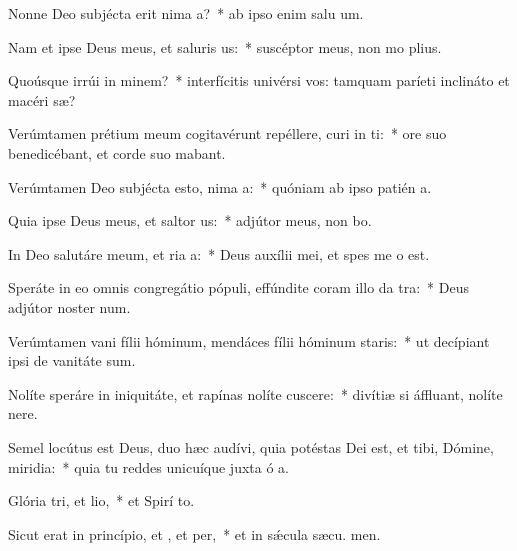 \item Nonne Deo subjécta erit nima a?~* ab ipso enim salu um.
\item Nam et ipse Deus meus, et saluris us:~* suscéptor meus, non mo plius.
\item Quoúsque irrúi in minem?~* interfícitis univérsi vos: tamquam paríeti inclináto et macéri sæ?
\item Verúmtamen prétium meum cogitavérunt repéllere, curi in ti:~* ore suo benedicébant, et corde suo mabant.
\item Verúmtamen Deo subjécta esto, nima a:~* quóniam ab ipso patién a.
\item Quia ipse Deus meus, et saltor us:~* adjútor meus, non bo.
\item In Deo salutáre meum, et ria a:~* Deus auxílii mei, et spes me  o est.
\item Speráte in eo omnis congregátio pópuli, effúndite coram illo da tra:~* Deus adjútor noster  num.
\item Verúmtamen vani fílii hóminum, mendáces fílii hóminum  staris:~* ut decípiant ipsi de vanitáte  sum.
\item Nolíte speráre in iniquitáte, et rapínas nolíte cuscere:~* divítiæ si áffluant, nolíte  nere.
\item Semel locútus est Deus, duo hæc audívi, quia potéstas Dei est, et tibi, Dómine, miridia:~* quia tu reddes unicuíque juxta ó a.
\item Glória tri, et lio,~* et Spirí to.
\item Sicut erat in princípio, et , et per,~* et in sǽcula sæcu. men.

